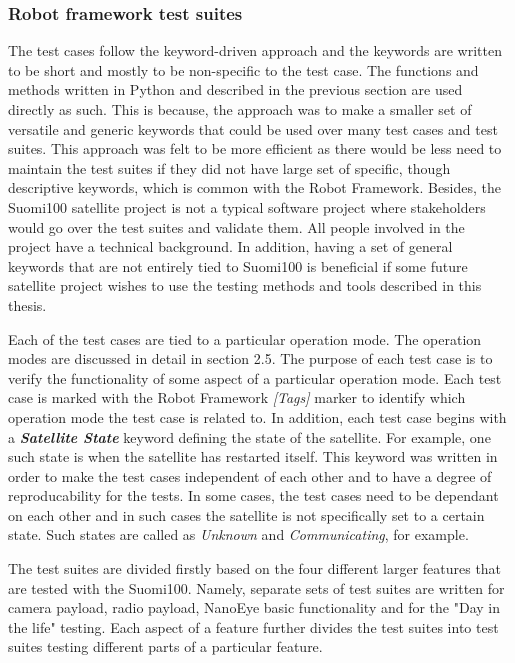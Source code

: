 \documentclass[english,12pt,a4paper,pdftex,elec,utf8]{aaltothesis}
\begin{document}
    
\subsubsection{Robot framework test suites}
The test cases follow the keyword-driven approach and the keywords are written to be short and mostly to be non-specific to the test case. The functions and methods written in Python and described in the previous section are used directly as such. This is because, the approach was to make a smaller set of versatile and generic keywords that could be used over many test cases and test suites. This approach was felt to be more efficient as there would be less need to maintain the test suites if they did not have large set of specific, though descriptive keywords, which is common with the Robot Framework. Besides, the Suomi100 satellite project is not a typical software project where stakeholders would go over the test suites and validate them. All people involved in the project have a technical background. In addition, having a set of general keywords that are not entirely tied to Suomi100 is beneficial if some future satellite project wishes to use the testing methods and tools described in this thesis.\par
Each of the test cases are tied to a particular operation mode. The operation modes are discussed in detail in section 2.5. The purpose of each test case is to verify the functionality of some aspect of a particular operation mode. Each test case is marked with the Robot Framework \textit{[Tags]} marker to identify which operation mode the test case is related to.
In addition, each test case begins with a \textbf{\textit{Satellite State}} keyword defining the state of the satellite. For example, one such state is when the satellite has restarted itself. This keyword was written in order to make the test cases independent of each other and to have a degree of reproducability for the tests. In some cases, the test cases need to be dependant on each other and in such cases the satellite is not specifically set to a certain state. Such states are called as \textit{Unknown} and \textit{Communicating}, for example.\par 
The test suites are divided firstly based on the four different larger features that are tested with the Suomi100. Namely, separate sets of test suites are written for camera payload, radio payload, NanoEye basic functionality and for the "Day in the life" testing. Each aspect of a feature further divides the test suites into test suites testing different parts of a  particular feature.\par   
\end{document}
